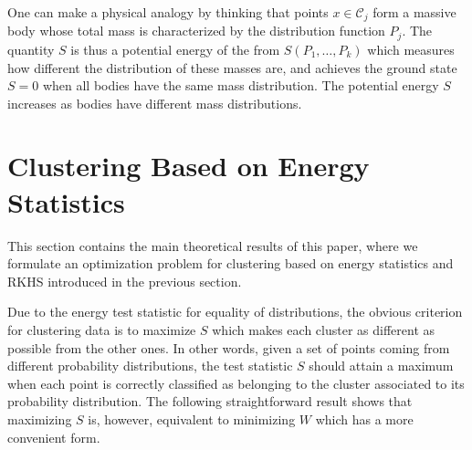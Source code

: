 \documentclass[aps,preprint,nofootinbib,floatfix]{revtex4-1}
\newcommand\C{{\mathcal{C}}}
\begin{document}
One can make a physical analogy by thinking 
that points $ x \in \C_j$ form a massive body 
whose total mass is characterized by the distribution function $P_j$.
The quantity $S$ is thus a potential
energy of the from $S(P_1,\dotsc,P_k)$ which measures how different
the distribution of these masses are,  and achieves the ground state
$S=0$ when all bodies have the same mass distribution. The potential energy
$S$ increases as bodies have different mass distributions.


\section{Clustering Based on Energy Statistics}
\label{sec:clustering_theory}



This section contains the main theoretical results of this paper, where 
we formulate an optimization problem for clustering 
based on energy statistics and RKHS introduced in the previous section.

Due to the energy test statistic for equality of distributions,
the obvious
criterion for clustering data is to 
maximize $S$ which makes 
each cluster as different
as possible from the other ones.
In other words, given a set of points coming from different probability
distributions, the test statistic $S$ should attain a maximum when 
each point is correctly
classified as belonging to the cluster associated to its probability
distribution.
The following 
straightforward result
shows that maximizing $S$ is, however, equivalent to minimizing
$W$ which has a more convenient form.
\end{document}
